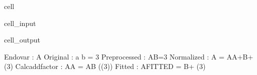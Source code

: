 \documentclass[letterpaper,10pt,english]{jupyterBook}
\begin{document}
\begin{sphinxuseclass}{cell}\begin{sphinxVerbatimInput}

\begin{sphinxuseclass}{cell_input}
\begin{sphinxVerbatim}[commandchars=\\\{\}]
\end{sphinxVerbatim}

\end{sphinxuseclass}\end{sphinxVerbatimInput}
\begin{sphinxVerbatimOutput}

\begin{sphinxuseclass}{cell_output}
\begin{sphinxVerbatim}[commandchars=\\\{\}]
Endo\PYGZus{}var        : A
Original        : a \PYGZhy{} b = 3 
Preprocessed    : A\PYGZhy{}B=3
Normalized      : A = A\PYGZus{}A+B+ (3) 
Calc\PYGZus{}add\PYGZus{}factor : A\PYGZus{}A = A\PYGZhy{}B\PYGZhy{} ((3)) 
Fitted          : A\PYGZus{}FITTED = B+ (3) 
\end{sphinxVerbatim}

\begin{sphinxVerbatim}[commandchars=\\\{\}]

\end{sphinxVerbatim}

\end{sphinxuseclass}\end{sphinxVerbatimOutput}

\end{sphinxuseclass}
\end{document}
